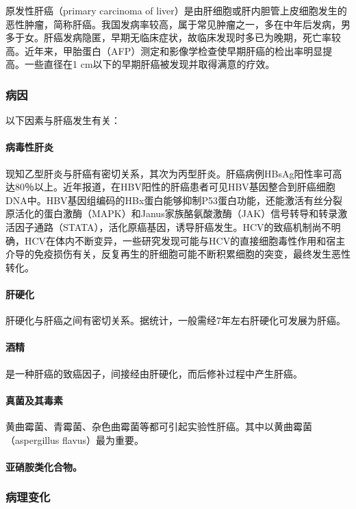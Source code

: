 原发性肝癌（primary carcinoma of
liver）是由肝细胞或肝内胆管上皮细胞发生的恶性肿瘤，简称肝癌。我国发病率较高，属于常见肿瘤之一，多在中年后发病，男多于女。肝癌发病隐匿，早期无临床症状，故临床发现时多已为晚期，死亡率较高。近年来，甲胎蛋白（AFP）测定和影像学检查使早期肝癌的检出率明显提高。一些直径在1
cm以下的早期肝癌被发现并取得满意的疗效。

\subsubsection{病因}

以下因素与肝癌发生有关：

\paragraph{病毒性肝炎}
现知乙型肝炎与肝癌有密切关系，其次为丙型肝炎。肝癌病例HBsAg阳性率可高达80％以上。近年报道，在HBV阳性的肝癌患者可见HBV基因整合到肝癌细胞DNA中。HBV基因组编码的HBx蛋白能够抑制P53蛋白功能，还能激活有丝分裂原活化的蛋白激酶（MAPK）和Janus家族酪氨酸激酶（JAK）信号转导和转录激活因子通路（STATA），活化原癌基因，诱导肝癌发生。HCV的致癌机制尚不明确，HCV在体内不断变异，一些研究发现可能与HCV的直接细胞毒性作用和宿主介导的免疫损伤有关，反复再生的肝细胞可能不断积累细胞的突变，最终发生恶性转化。

\paragraph{肝硬化}
肝硬化与肝癌之间有密切关系。据统计，一般需经7年左右肝硬化可发展为肝癌。

\paragraph{酒精}
是一种肝癌的致癌因子，间接经由肝硬化，而后修补过程中产生肝癌。

\paragraph{真菌及其毒素}
黄曲霉菌、青霉菌、杂色曲霉菌等都可引起实验性肝癌。其中以黄曲霉菌（aspergillus
flavus）最为重要。

\paragraph{亚硝胺类化合物。}
\subsubsection{病理变化}

